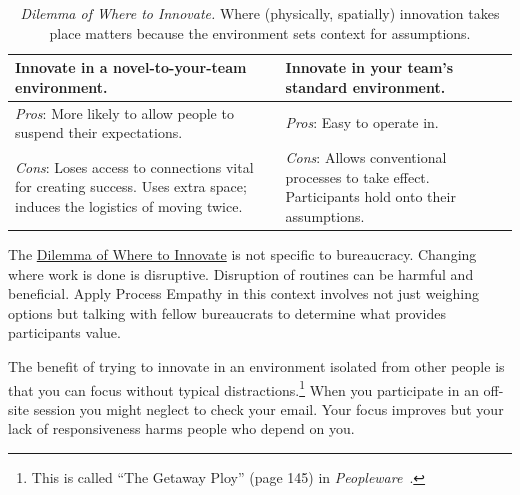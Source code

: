 \begin{center}
\begin{table}[H] %
\begin{tabular}{ | m{\dilemmatablewidth}| m{\dilemmatablewidth} | } 
  \hline
  \textbf{Innovate in a novel-to-your-team environment.} &
  \textbf{Innovate in your team's standard environment.} \\
  \hline
  \textit{Pros}: More likely to allow people to suspend their expectations.  & 
  \textit{Pros}: Easy to operate in. \\
  \hline
  \textit{Cons}: Loses access to connections vital for creating success. Uses extra space; induces the logistics of moving twice. & 
  \textit{Cons}: Allows conventional processes to take effect. Participants hold onto their assumptions. \\
  \hline
\end{tabular}
\caption{
\textit{Dilemma of Where to Innovate.}
Where (physically, spatially) innovation takes place matters because the environment sets context for assumptions.
}
\label{table:dilemma-personal-where-to-innovate}
\end{table}
\end{center}

The \hyperref[table:dilemma-personal-where-to-innovate]{Dilemma of Where to Innovate} 
\iftoggle{printedonpaper}{ (\ref{table:dilemma-personal-where-to-innovate}) }{}%
is not specific to bureaucracy. Changing where work is done is disruptive. Disruption of routines can be harmful and beneficial. Apply Process Empathy in this context involves not just weighing options but talking with fellow bureaucrats to determine what provides participants value. 

The benefit of trying to innovate in an
environment isolated from other people is that you can focus without typical distractions.\footnote{This is called ``The Getaway Ploy'' (page 145) in \textit{Peopleware}~\cite{1987_DeMarco}.} When you participate in an off-site session you might neglect to check your email. Your focus improves but your lack of responsiveness harms people who depend on you.

